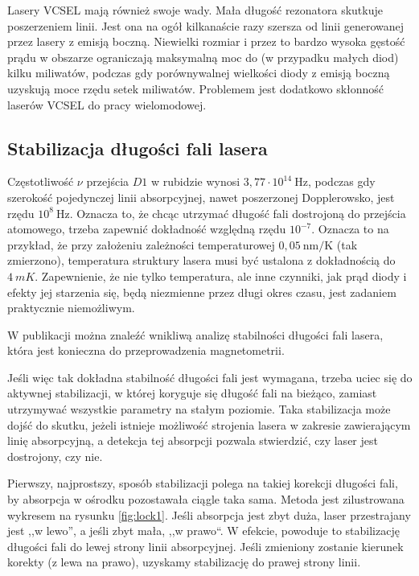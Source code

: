 \documentclass[a4paper,10pt]{article}
\begin{document}
Lasery VCSEL mają również swoje wady. Mała długość rezonatora skutkuje poszerzeniem linii. Jest ona na ogół kilkanaście razy szersza od linii generowanej przez lasery z emisją boczną. Niewielki rozmiar i przez to bardzo wysoka gęstość prądu w obszarze ograniczają maksymalną moc do (w przypadku małych diod) kilku miliwatów, podczas gdy porównywalnej wielkości diody z emisją boczną uzyskują moce rzędu setek miliwatów. Problemem jest dodatkowo skłonność laserów VCSEL do pracy wielomodowej.


\subsection{Stabilizacja długości fali lasera}

Częstotliwość $\nu$ przejścia $D1$ w rubidzie wynosi $3{,}77 \cdot 10^{14}~
\mathrm{Hz}$, podczas gdy szerokość pojedynczej linii absorpcyjnej,
nawet poszerzonej Dopplerowsko, jest rzędu $10^8~\mathrm{Hz}$. Oznacza to, że 
chcąc utrzymać długość fali dostrojoną do przejścia atomowego,
trzeba zapewnić dokładność względną rzędu $10^{-7}$. Oznacza to na przykład, że przy założeniu zależności temperaturowej $0{,}05 ~\mathrm{nm/K}$ (tak zmierzono), temperatura struktury lasera musi być ustalona z dokładnością do $4~mK$. Zapewnienie,
że nie tylko temperatura, ale inne czynniki, jak prąd diody i efekty jej 
starzenia się, będą niezmienne przez długi okres czasu, jest zadaniem 
praktycznie niemożliwym.

W publikacji \cite{sensitivity} można znaleźć wnikliwą analizę stabilności długości fali lasera, która jest konieczna do przeprowadzenia magnetometrii. 

Jeśli więc tak dokładna stabilność długości fali jest wymagana, trzeba uciec się do aktywnej 
stabilizacji, w której koryguje się długość fali na bieżąco, zamiast utrzymywać 
wszystkie parametry na stałym poziomie.
Taka stabilizacja może dojść do skutku, jeżeli istnieje możliwość strojenia 
lasera w zakresie zawierającym linię absorpcyjną, a detekcja tej absorpcji pozwala stwierdzić, czy laser jest dostrojony, czy nie.

Pierwszy, najprostszy, sposób stabilizacji polega na takiej korekcji długości 
fali, by absorpcja w ośrodku pozostawała ciągle taka sama.
Metoda jest zilustrowana wykresem na rysunku \ref{fig:lock1}. Jeśli absorpcja 
jest zbyt duża, laser przestrajany jest ,,w lewo'', a jeśli zbyt mała, ,,w 
prawo``.
W efekcie, powoduje to stabilizację długości fali do lewej strony linii absorpcyjnej.
Jeśli zmieniony zostanie kierunek korekty (z lewa na prawo), uzyskamy stabilizację do prawej strony linii.
\end{document}
